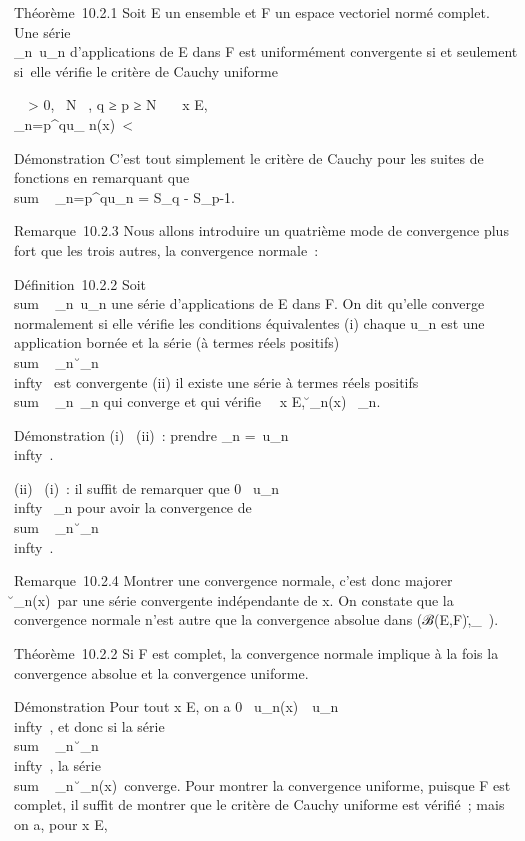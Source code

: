 \documentclass[]{article}
\begin{document}
Théorème~10.2.1 Soit E un ensemble et F un espace vectoriel normé
complet. Une série \\\sum
 _n\in{}~u_n d'applications de E dans F est uniformément
convergente si et seulement si~elle vérifie le critère de Cauchy
uniforme

\forall~~\epsilon > 0,
\exists~N \in {}~, q ≥ p ≥ N
\rigtharrow~\forall~~x \in E,
\\\sum
_n=p^qu_ n(x)\
< \epsilon

Démonstration C'est tout simplement le critère de Cauchy pour les suites
de fonctions en remarquant que
\\sum ~
_n=p^qu_n = S_q - S_p-1.

Remarque~10.2.3 Nous allons introduire un quatrième mode de convergence
plus fort que les trois autres, la convergence normale~:

Définition~10.2.2 Soit
\\sum ~
_n\in{}~u_n une série d'applications de E dans F. On dit
qu'elle converge normalement si elle vérifie les conditions équivalentes
(i) chaque u_n est une application bornée et la série (à termes
réels positifs) \\sum ~
_n\in{}~\u_n\\infty~
est convergente (ii) il existe une série à termes réels positifs
\\sum ~
_n\in{}~\alpha_n qui converge et qui vérifie
\forall~~x \in E,
\u_n(x)\ \leq
\alpha_n.

Démonstration (i) \rigtharrow~(ii)~: prendre \alpha_n
=\ u_n\\infty~.

(ii) \rigtharrow~(i)~: il suffit de remarquer que 0 \leq\
u_n\\infty~ \leq \alpha_n pour avoir la
convergence de \\sum ~
_n\in{}~\u_n\\infty~.

Remarque~10.2.4 Montrer une convergence normale, c'est donc majorer
\u_n(x)\ par
une série convergente indépendante de x. On constate que la convergence
normale n'est autre que la convergence absolue dans
(ℬ(E,F),\._\infty~).

Théorème~10.2.2 Si F est complet, la convergence normale implique à la
fois la convergence absolue et la convergence uniforme.

Démonstration Pour tout x \in E, on a 0 \leq\
u_n(x)\ \leq\
u_n\\infty~, et donc si la série
\\sum ~
_n\in{}~\u_n\\infty~,
la série \\sum ~
_n\in\mathbb{N}~\u_n(x)\
converge. Pour montrer la convergence uniforme, puisque F est complet,
il suffit de montrer que le critère de Cauchy uniforme est vérifié~;
mais on a, pour x \in E,
\end{document}
